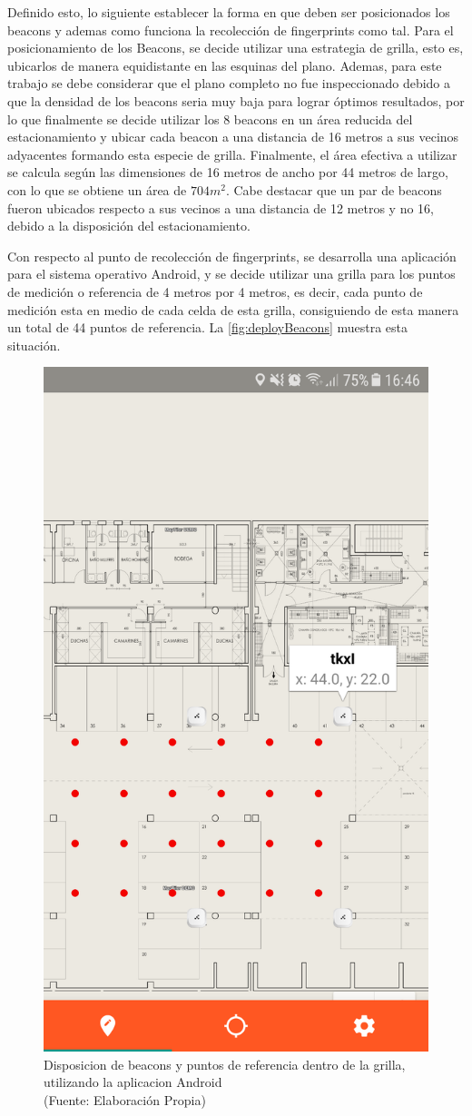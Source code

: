 Definido esto, lo siguiente establecer la forma en que deben ser posicionados los beacons y ademas como funciona la recolección de fingerprints como tal. Para el posicionamiento de los Beacons, se decide utilizar una estrategia de grilla, esto es, ubicarlos de manera equidistante en las esquinas del plano. Ademas, para este trabajo se debe considerar que el plano completo no fue inspeccionado debido a que la densidad de los beacons seria muy baja para lograr óptimos resultados, por lo que finalmente se decide utilizar los 8 beacons en un área reducida del estacionamiento y ubicar cada beacon a una distancia de 16 metros a sus vecinos adyacentes formando esta especie de grilla. Finalmente, el área efectiva a utilizar se calcula según las dimensiones de 16 metros de ancho por 44 metros de largo, con lo que se obtiene un área de $704m^2$. Cabe destacar que un par de beacons fueron ubicados respecto a sus vecinos a una distancia de 12 metros y no 16, debido a la disposición del estacionamiento. 

Con respecto al punto de recolección de fingerprints, se desarrolla una aplicación para el sistema operativo Android, y se decide utilizar una grilla para los puntos de medición o referencia de 4 metros por 4 metros, es decir, cada punto de medición esta en medio de cada celda de esta grilla, consiguiendo de esta manera un total de 44 puntos de referencia. La \autoref{fig:deployBeacons} muestra esta situación.


\begin{figure}[ht!]
\centering
\includegraphics[width=.3\textwidth]{figures/deployBeacons.png}
\caption[abs]{Disposicion de beacons y puntos de referencia dentro de la grilla, utilizando la aplicacion Android\\
{\scriptsize (Fuente: Elaboración Propia)}}
\label{fig:deployBeacons}
\end{figure}

